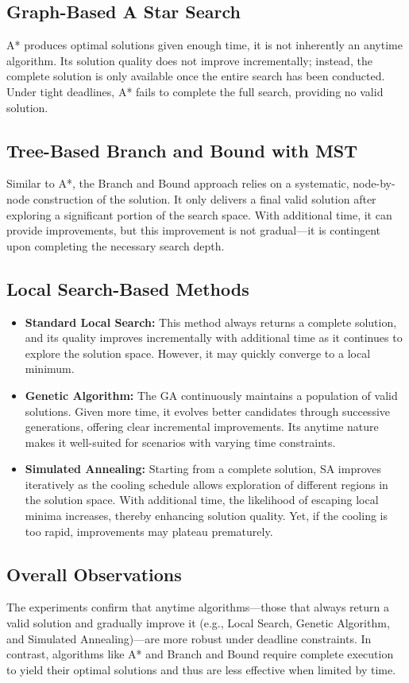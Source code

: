 \documentclass[11pt]{article}
\begin{document}
	\subsection{Graph-Based A Star Search}
	A* produces optimal solutions given enough time, it is not inherently an anytime algorithm. Its solution quality does not improve incrementally; instead, the complete solution is only available once the entire search has been conducted. Under tight deadlines, A* fails to complete the full search, providing no valid solution.
	
	\subsection{Tree-Based Branch and Bound with MST} 
	Similar to A*, the Branch and Bound approach relies on a systematic, node-by-node construction of the solution. It only delivers a final valid solution after exploring a significant portion of the search space. With additional time, it can provide improvements, but this improvement is not gradual—it is contingent upon completing the necessary search depth.
	
	\subsection{Local Search-Based Methods}
	\begin{itemize}[noitemsep]
		\item \textbf{Standard Local Search:} This method always returns a complete solution, and its quality improves incrementally with additional time as it continues to explore the solution space. However, it may quickly converge to a local minimum.
		\item \textbf{Genetic Algorithm:} The GA continuously maintains a population of valid solutions. Given more time, it evolves better candidates through successive generations, offering clear incremental improvements. Its anytime nature makes it well-suited for scenarios with varying time constraints.
		\item \textbf{Simulated Annealing:} Starting from a complete solution, SA improves iteratively as the cooling schedule allows exploration of different regions in the solution space. With additional time, the likelihood of escaping local minima increases, thereby enhancing solution quality. Yet, if the cooling is too rapid, improvements may plateau prematurely.
	\end{itemize}
	
	\subsection{Overall Observations}
	The experiments confirm that anytime algorithms—those that always return a valid solution and gradually improve it (e.g., Local Search, Genetic Algorithm, and Simulated Annealing)—are more robust under deadline constraints. In contrast, algorithms like A* and Branch and Bound require complete execution to yield their optimal solutions and thus are less effective when limited by time.
	
\end{document}
